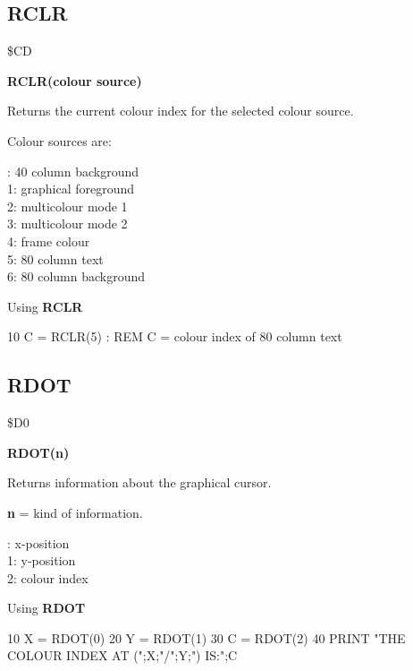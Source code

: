 
\newpage
\subsection{RCLR}
\begin{description}[leftmargin=3cm,style=nextline]
\item [Token:] \$CD
\item [Format:] {\bf RCLR(colour source)}
\item [Usage:]  Returns the current colour index for the
                selected colour source.

                Colour sources are:

{: 40 column background \\
                1: graphical foreground \\
                2: multicolour mode 1 \\
                3: multicolour mode 2 \\
                4: frame colour \\
                5: 80 column text \\
                6: 80 column background
}
\item [Example:] Using {\bf RCLR}

\begin{screenoutput}
 10 C = RCLR(5)  : REM C = colour index of 80 column text
\end{screenoutput}
\end{description}


\newpage
\subsection{RDOT}
\begin{description}[leftmargin=3cm,style=nextline]
\item [Token:] \$D0
\item [Format:] {\bf RDOT(n)}
\item [Usage:]  Returns information about the graphical cursor.

                {\bf n} = kind of information.

{: x-position \\
                1: y-position \\
                2: colour index
}

\item [Example:] Using {\bf RDOT}

\begin{screenoutput}
 10 X = RDOT(0)
 20 Y = RDOT(1)
 30 C = RDOT(2)
 40 PRINT "THE COLOUR INDEX AT (";X;"/";Y;") IS:";C
\end{screenoutput}
\end{description}

